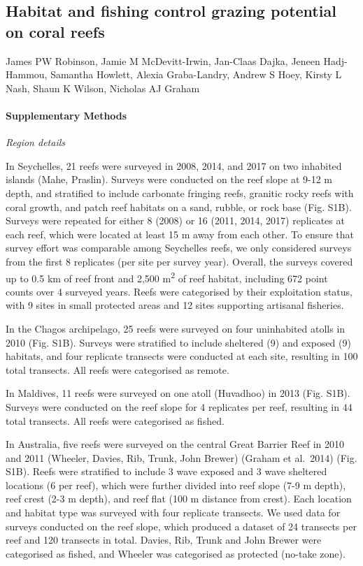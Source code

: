 \documentclass[12pt,]{article}
\title{}
\author{}
\date{}
\let\oldparagraph\paragraph
\renewcommand{\paragraph}[1]{\oldparagraph{#1}\mbox{}}
\begin{document}
\hypertarget{habitat-and-fishing-control-grazing-potential-on-coral-reefs}{%
\subsection{Habitat and fishing control grazing potential on coral
reefs}\label{habitat-and-fishing-control-grazing-potential-on-coral-reefs}}

James PW Robinson, Jamie M McDevitt-Irwin, Jan-Claas Dajka, Jeneen
Hadj-Hammou, Samantha Howlett, Alexia Graba-Landry, Andrew S Hoey,
Kirsty L Nash, Shaun K Wilson, Nicholas AJ Graham

\hypertarget{supplementary-methods}{%
\paragraph{Supplementary Methods}\label{supplementary-methods}}

\emph{Region details}

In Seychelles, 21 reefs were surveyed in 2008, 2014, and 2017 on two
inhabited islands (Mahe, Praslin). Surveys were conducted on the reef
slope at 9-12 m depth, and stratified to include carbonate fringing
reefs, granitic rocky reefs with coral growth, and patch reef habitats
on a sand, rubble, or rock base (Fig. S1B). Surveys were repeated for
either 8 (2008) or 16 (2011, 2014, 2017) replicates at each reef, which
were located at least 15 m away from each other. To ensure that survey
effort was comparable among Seychelles reefs, we only considered surveys
from the first 8 replicates (per site per survey year). Overall, the
surveys covered up to 0.5 km of reef front and 2,500
m\textsuperscript{2} of reef habitat, including 672 point counts over 4
surveyed years. Reefs were categorised by their exploitation status,
with 9 sites in small protected areas and 12 sites supporting artisanal
fisheries.

In the Chagos archipelago, 25 reefs were surveyed on four uninhabited
atolls in 2010 (Fig. S1B). Surveys were stratified to include sheltered
(9) and exposed (9) habitats, and four replicate transects were
conducted at each site, resulting in 100 total transects. All reefs were
categorised as remote.

In Maldives, 11 reefs were surveyed on one atoll (Huvadhoo) in 2013
(Fig. S1B). Surveys were conducted on the reef slope for 4 replicates
per reef, resulting in 44 total transects. All reefs were categorised as
fished.

In Australia, five reefs were surveyed on the central Great Barrier Reef
in 2010 and 2011 (Wheeler, Davies, Rib, Trunk, John Brewer) (Graham et
al.~2014) (Fig. S1B). Reefs were stratified to include 3 wave exposed
and 3 wave sheltered locations (6 per reef), which were further divided
into reef slope (7-9 m depth), reef crest (2-3 m depth), and reef flat
(100 m distance from crest). Each location and habitat type was surveyed
with four replicate transects. We used data for surveys conducted on the
reef slope, which produced a dataset of 24 transects per reef and 120
transects in total. Davies, Rib, Trunk and John Brewer were categorised
as fished, and Wheeler was categorised as protected (no-take zone).
\end{document}
